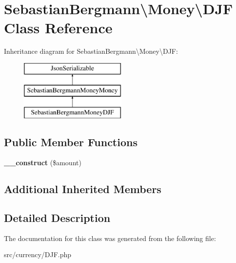 \hypertarget{classSebastianBergmann_1_1Money_1_1DJF}{}\section{Sebastian\+Bergmann\textbackslash{}Money\textbackslash{}D\+J\+F Class Reference}
\label{classSebastianBergmann_1_1Money_1_1DJF}
Inheritance diagram for Sebastian\+Bergmann\textbackslash{}Money\textbackslash{}D\+J\+F\+:\begin{figure}[H]
\begin{center}
\leavevmode
\includegraphics[height=3.000000cm]{classSebastianBergmann_1_1Money_1_1DJF}
\end{center}
\end{figure}
\subsection*{Public Member Functions}
\begin{DoxyCompactItemize}
\item 
\hypertarget{classSebastianBergmann_1_1Money_1_1DJF_ab1625f76e3ba5bb4e715acda00e53817}{}{\bfseries \+\_\+\+\_\+construct} (\$amount)\label{classSebastianBergmann_1_1Money_1_1DJF_ab1625f76e3ba5bb4e715acda00e53817}

\end{DoxyCompactItemize}
\subsection*{Additional Inherited Members}


\subsection{Detailed Description}


The documentation for this class was generated from the following file\+:\begin{DoxyCompactItemize}
\item 
src/currency/D\+J\+F.\+php\end{DoxyCompactItemize}
